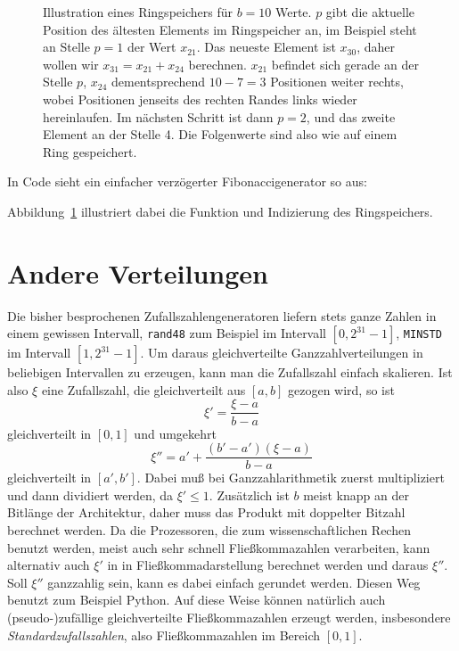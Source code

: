 \begin{figure}
  \caption{Illustration eines Ringspeichers für $b=10$ Werte. $p$ gibt
    die aktuelle Position des ältesten Elements im Ringspeicher an, im
    Beispiel steht an Stelle $p=1$ der Wert $x_{21}$. Das neueste
    Element ist $x_{30}$, daher wollen wir $x_{31}=x_{21} + x_{24}$
    berechnen. $x_{21}$ befindet sich gerade an der Stelle $p$,
    $x_{24}$ dementsprechend $10-7 = 3$ Positionen weiter rechts,
    wobei Positionen jenseits des rechten Randes links wieder
    hereinlaufen. Im nächsten Schritt ist dann $p=2$, und das zweite
    Element an der Stelle 4. Die Folgenwerte sind also wie auf einem
    Ring gespeichert.}
  \label{fig:ringspeicher}
\end{figure}

In Code sieht ein einfacher verzögerter Fibonaccigenerator so aus:

Abbildung~\ref{fig:ringspeicher} illustriert dabei die Funktion und
Indizierung des Ringspeichers.

\section{Andere Verteilungen}

Die bisher besprochenen Zufallszahlengeneratoren liefern stets ganze
Zahlen in einem gewissen Intervall, \texttt{rand48} zum Beispiel
im Intervall $[0,2^{31}-1]$, \texttt{MINSTD} im Intervall
$[1,2^{31}-1]$. Um daraus gleichverteilte Ganzzahlverteilungen in
beliebigen Intervallen zu erzeugen, kann man die Zufallszahl einfach
skalieren. Ist also $\xi$ eine Zufallszahl, die gleichverteilt aus
$[a,b]$ gezogen wird, so ist
\begin{equation}
  \xi' = \frac{\xi - a}{b-a}
\end{equation}
gleichverteilt in $[0,1]$ und umgekehrt
\begin{equation}
  \xi'' = a' + \frac{(b'-a')(\xi - a)}{b-a}
\end{equation}
gleichverteilt in $[a',b']$. Dabei muß bei Ganzzahlarithmetik zuerst
multipliziert und dann dividiert werden, da $\xi' \le 1$. Zusätzlich
ist $b$ meist knapp an der Bitlänge der Architektur, daher muss das
Produkt mit doppelter Bitzahl berechnet werden. Da die Prozessoren,
die zum wissenschaftlichen Rechen benutzt werden, meist auch sehr
schnell Fließkommazahlen verarbeiten, kann alternativ auch $\xi'$ in
in Fließkommadarstellung berechnet werden und daraus $\xi''$. Soll
$\xi''$ ganzzahlig sein, kann es dabei einfach gerundet werden. Diesen
Weg benutzt zum Beispiel Python. Auf diese Weise können natürlich auch
(pseudo-)zufällige gleichverteilte Fließkommazahlen erzeugt werden,
insbesondere \emph{Standardzufallszahlen},
also Fließkommazahlen im Bereich $[0,1]$.

